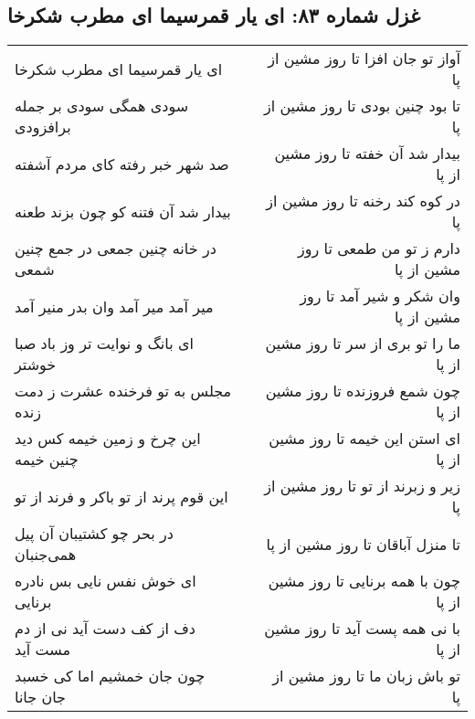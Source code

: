 \begin{center}
\section*{غزل شماره ۸۳: ای یار قمرسیما ای مطرب شکرخا}
\label{sec:0083}
\begin{longtable}{l p{0.5cm} r}
ای یار قمرسیما ای مطرب شکرخا
&&
آواز تو جان افزا تا روز مشین از پا
\\
سودی همگی سودی بر جمله برافزودی
&&
تا بود چنین بودی تا روز مشین از پا
\\
صد شهر خبر رفته کای مردم آشفته
&&
بیدار شد آن خفته تا روز مشین از پا
\\
بیدار شد آن فتنه کو چون بزند طعنه
&&
در کوه کند رخنه تا روز مشین از پا
\\
در خانه چنین جمعی در جمع چنین شمعی
&&
دارم ز تو من طمعی تا روز مشین از پا
\\
میر آمد میر آمد وان بدر منیر آمد
&&
وان شکر و شیر آمد تا روز مشین از پا
\\
ای بانگ و نوایت تر وز باد صبا خوشتر
&&
ما را تو بری از سر تا روز مشین از پا
\\
مجلس به تو فرخنده عشرت ز دمت زنده
&&
چون شمع فروزنده تا روز مشین از پا
\\
این چرخ و زمین خیمه کس دید چنین خیمه
&&
ای استن این خیمه تا روز مشین از پا
\\
این قوم پرند از تو باکر و فرند از تو
&&
زیر و زبرند از تو تا روز مشین از پا
\\
در بحر چو کشتیبان آن پیل همی‌جنبان
&&
تا منزل آباقان تا روز مشین از پا
\\
ای خوش نفس نایی بس نادره برنایی
&&
چون با همه برنایی تا روز مشین از پا
\\
دف از کف دست آید نی از دم مست آید
&&
با نی همه پست آید تا روز مشین از پا
\\
چون جان خمشیم اما کی خسبد جان جانا
&&
تو باش زبان ما تا روز مشین از پا
\\
\end{longtable}
\end{center}
